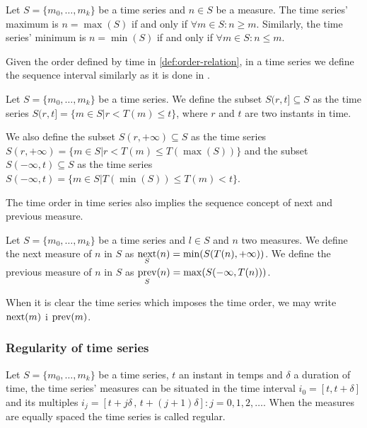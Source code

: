 \begin{definition}
  Let $S=\{m_0,\ldots,m_k\}$ be a time series and $n\in S$ be a
  measure. The time series' maximum is $n=\max(S)$ if and only if
  $\forall m \in S: n \geq m $.  Similarly, the time series' minimum
  is $n=\min(S)$ if and only if $\forall m \in S: n \leq m$.
\end{definition}

Given the order defined by time in \ref{def:order-relation}, in a time
series we define the sequence interval similarly as it is done in \cite{last:keogh,last:hetland}.

\begin{definition}
  Let $S=\{m_0, \ldots, m_k\}$ be a time series. We define the subset
  $S(r,t] \subseteq S$ as the time series $S(r,t]=\{m\in S |
  r<T(m)\leq t\}$, where $r$ and $t$ are two instants in time.

  We also define the subset $S(r,+\infty)\subseteq S$ as the time
  series $S(r,+\infty) = \{m\in S | r< T(m) \leq T(\max(S))\}$ and the
  subset $S(-\infty,t)\subseteq S$ as the time series $S(-\infty,t) =
  \{m\in S | T(\min(S))\leq T(m) < t\}$.
\end{definition}

The time order in time series also implies the sequence concept of
next and previous measure.

\begin{definition}
  Let $S=\{m_0, \ldots, m_k\}$ be a time series and $l\in S$ and $n$
  two measures. We define the next measure of $n$ in $S$ as
  $\operatorname*{next}\limits_S(n) = \min(S(T(n),+\infty))$. We define the previous
  measure of $n$ in $S$ as $\operatorname*{prev}\limits_S(n) =
  \max(S(-\infty,T(n)))$.
\end{definition}

When it is clear the time series which imposes the time order, we may
write $\operatorname*{next}(m)$ i $\operatorname*{prev}(m)$.



\subsubsection{Regularity of time series} 

Let $S=\{m_0,\ldots,m_k\}$ be a time series, $t$ an instant in temps
and $\delta$ a duration of time, the time series' measures can be
situated in the time interval $i_0=[t,t+\delta]$ and its multiples
$i_j=[t+j\delta \,,\, t+(j+1)\delta]: j=0,1,2,\ldots$. When the
measures are equally spaced the time series is called regular.

